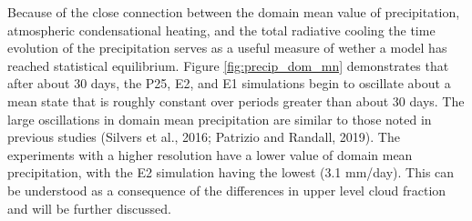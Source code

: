 \documentclass[11pt]{article}   	%
\begin{document}
%

Because of the close connection between the domain mean value of precipitation, atmospheric condensational heating, and 
the total radiative cooling the time evolution of the precipitation serves as a useful measure of wether a model has 
reached statistical equilibrium.  Figure \ref{fig:precip_dom_mn} demonstrates that after about 30 days, the P25, E2, and E1
simulations begin to oscillate about a mean state that is roughly constant over periods greater than about 30 days. 
The large oscillations in domain mean precipitation are similar to those noted in previous studies 
(Silvers et al., 2016; Patrizio and Randall, 2019).   The experiments with a higher resolution have a lower value of domain
mean precipitation, with the E2 simulation having the lowest (3.1 mm/day).  This can be understood as a consequence
of the differences in upper level cloud fraction and will be further discussed.   
\end{document}
